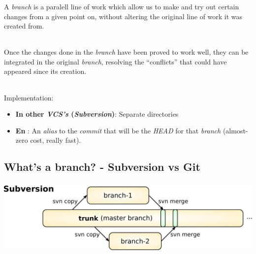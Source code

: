 \begin{frame}
  \frametitle{\insertsubsection}

  A \textit{branch} is a paralell line of work which allow us to make
  and try out certain changes from a given point on, without altering
  the original line of work it was created from.\pause
  \\ \ \vspacing

  Once the changes done in the \textit{branch} have been proved to
  work well, they can be integrated in the original \textit{branch},
  resolving the ``conflicts'' that could have appeared since its
  creation.\pause \\ \ \vspacing

  Implementation:
  \begin{itemize}
  \item \textbf{In other \textit{VCS's} (\textit{Subversion})}: Separate directories \vspacing

  \item \textbf{En \git}: An \textit{alias} to the \textit{commit}
    that will be the \textit{HEAD} for that \textit{branch}
    (almost-zero cost, really fast).
  \end{itemize}
\end{frame}


\subsection{What's a branch? - Subversion vs Git}

\begin{frame}
  \frametitle{\insertsubsection}

  \begin{center}
    \includegraphics[width=1.0\textwidth]{images/pdf/svn-branches.pdf}
  \end{center}

  \begin{center}
  \end{center}
\end{frame}

